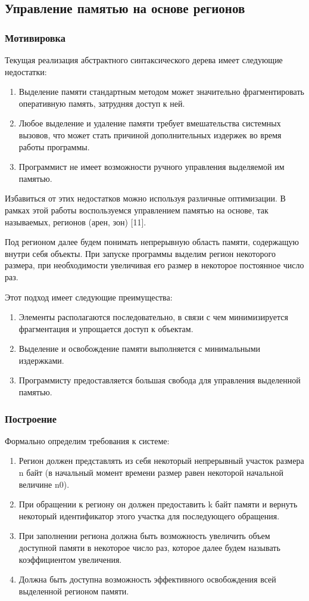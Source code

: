 \subsection{Управление памятью на основе регионов}
\subsubsection{Мотивировка}
Текущая реализация абстрактного синтаксического дерева имеет следующие недостатки:
\begin{enumerate}
    \item Выделение памяти стандартным методом может значительно фрагментировать оперативную память, затрудняя доступ к ней.
    \item Любое выделение и удаление памяти требует вмешательства системных вызовов, что может стать причиной дополнительных издержек во время работы программы.
    \item Программист не имеет возможности ручного управления выделяемой им памятью.
\end{enumerate}

Избавиться от этих недостатков можно используя различные оптимизации. В рамках этой работы воспользуемся управлением памятью на основе, так называемых, регионов (арен, зон) [11].

Под регионом далее будем понимать непрерывную область памяти, содержащую внутри себя объекты. При запуске программы выделим регион некоторого размера, при необходимости увеличивая его размер в некоторое постоянное число раз.

Этот подход имеет следующие преимущества:

\begin{enumerate}
    \item Элементы располагаются последовательно, в связи с чем минимизируется фрагментация и упрощается доступ к объектам.
    \item Выделение и освобождение памяти выполняется с минимальными издержками.
    \item Программисту предоставляется большая свобода для управления выделенной памятью.
\end{enumerate}

\subsubsection{Построение}
Формально определим требования к системе:
\begin{enumerate}
    \item Регион должен представлять из себя некоторый непрерывный участок размера n байт (в начальный момент времени размер равен некоторой начальной величине n0).
    \item При обращении к региону он должен предоставить k байт памяти и вернуть некоторый идентификатор этого участка для последующего обращения.
    \item При заполнении региона должна быть возможность увеличить объем доступной памяти в некоторое число раз, которое далее будем называть коэффициентом увеличения.
    \item Должна быть доступна возможность эффективного освобождения всей выделенной регионом памяти.
\end{enumerate}

